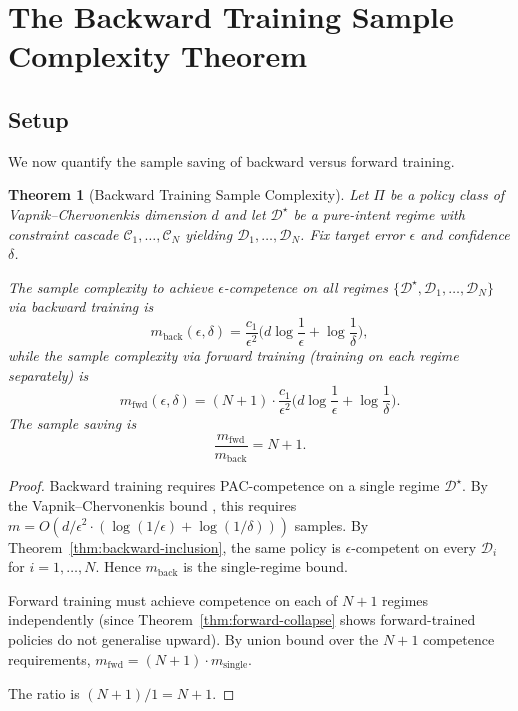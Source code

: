 \documentclass[11pt,twocolumn,a4paper]{article}
\newtheorem{theorem}{Theorem}[section]
\newcommand{\cD}{\mathcal{D}}
\newcommand{\cC}{\mathcal{C}}
\begin{document}
\section{The Backward Training Sample Complexity Theorem}
\label{sec:sample}

\subsection{Setup}

We now quantify the sample saving of backward versus forward training.

\begin{theorem}[Backward Training Sample Complexity]
\label{thm:sample-complexity}
Let $\Pi$ be a policy class of Vapnik--Chervonenkis dimension $d$ and let $\cD^\star$ be a pure-intent regime with constraint cascade $\cC_1, \ldots, \cC_N$ yielding $\cD_1, \ldots, \cD_N$. Fix target error $\epsilon$ and confidence $\delta$.

The sample complexity to achieve $\epsilon$-competence on all regimes $\{\cD^\star, \cD_1, \ldots, \cD_N\}$ via backward training is
\begin{equation}
m_{\text{back}}(\epsilon, \delta) = \frac{c_1}{\epsilon^2}\Big(d \log\frac{1}{\epsilon} + \log\frac{1}{\delta}\Big),
\end{equation}
while the sample complexity via forward training (training on each regime separately) is
\begin{equation}
m_{\text{fwd}}(\epsilon, \delta) = (N+1) \cdot \frac{c_1}{\epsilon^2}\Big(d \log\frac{1}{\epsilon} + \log\frac{1}{\delta}\Big).
\end{equation}
The sample saving is
\begin{equation}
\frac{m_{\text{fwd}}}{m_{\text{back}}} = N + 1.
\end{equation}
\end{theorem}

\begin{proof}
Backward training requires PAC-competence on a single regime $\cD^\star$. By the Vapnik--Chervonenkis bound \cite{blumer1989learnability,vapnik1998statistical}, this requires $m = O(d/\epsilon^2 \cdot (\log(1/\epsilon) + \log(1/\delta)))$ samples. By Theorem~\ref{thm:backward-inclusion}, the same policy is $\epsilon$-competent on every $\cD_i$ for $i = 1, \ldots, N$. Hence $m_{\text{back}}$ is the single-regime bound.

Forward training must achieve competence on each of $N+1$ regimes independently (since Theorem~\ref{thm:forward-collapse} shows forward-trained policies do not generalise upward). By union bound over the $N+1$ competence requirements, $m_{\text{fwd}} = (N+1) \cdot m_{\text{single}}$.

The ratio is $(N+1)/1 = N+1$.
\end{proof}
\end{document}
